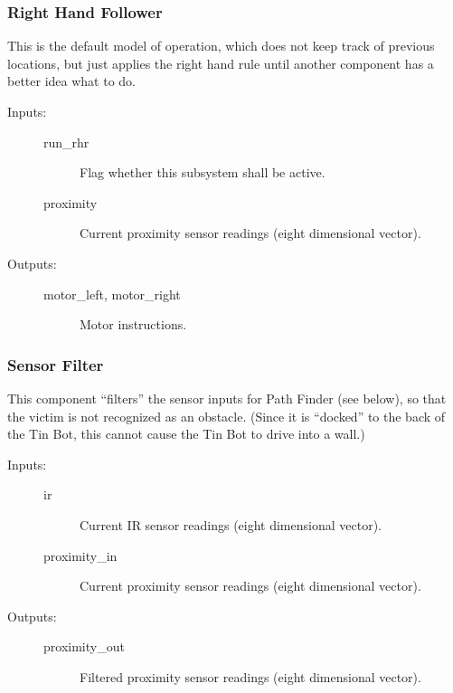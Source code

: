 \documentclass[a4paper,parskip,headheight=38pt]{scrartcl} %
\begin{document}
\subsubsection{Right Hand Follower}

This is the default model of operation,  which does not keep track of
previous locations, but just applies the right hand rule until another
component has a better idea what to do.

\begin{description}
\item[Inputs:] \hfill
	\begin{description}
	\item[run\_rhr] Flag whether this subsystem shall be active.
	\item[proximity] Current proximity sensor readings (eight dimensional vector).
	\end{description}
\item[Outputs:] \hfill
	\begin{description}
	\item[motor\_left, motor\_right] Motor instructions.
	\end{description}
\end{description}

\subsubsection{Sensor Filter}

This component \enquote{filters} the sensor inputs for Path Finder (see
below), so that the victim is not recognized as an obstacle.  (Since it
is \enquote{docked} to the back of the Tin Bot, this cannot cause the
Tin Bot to drive into a wall.)

\begin{description}
\item[Inputs:] \hfill
	\begin{description}
	\item[ir] Current IR sensor readings (eight dimensional vector).
	\item[proximity\_in] Current proximity sensor readings (eight dimensional vector).
	\end{description}
\item[Outputs:] \hfill
	\begin{description}
	\item[proximity\_out] Filtered proximity sensor readings (eight dimensional vector).
	\end{description}
\end{description}
\end{document}
